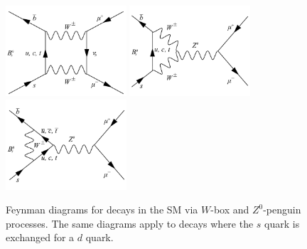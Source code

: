 \begin{figure}[bt]
    \centering
        \includegraphics[width=0.4\textwidth]{./Figs/Theory/W_diagram_2.pdf}
        \includegraphics[width=0.4\textwidth]{./Figs/Theory/Z0_penguin_v1.pdf}
        \includegraphics[width=0.4\textwidth]{./Figs/Theory/Z0_penguin_v2.pdf}
    \caption{Feynman diagrams for \bsmumu decays in the SM via $W$-box and $Z^0$-penguin processes. The same diagrams apply to \bdmumu decays where the $s$ quark is exchanged for a $d$ quark.}
    \label{fig:SM_diag}
\end{figure}




